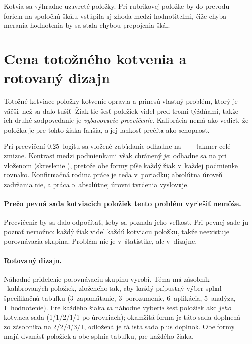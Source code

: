 Kotvia sa výhradne uzavreté položky. Pri rubrikovej položke by do prevodu foriem
na spoločnú škálu vstúpila aj zhoda medzi hodnotiteľmi, čiže chyba merania
hodnotenia by sa stala chybou prepojenia škál.

\section{Cena totožného kotvenia a rotovaný dizajn}
\label{sec:rotovane-kotvenie}

Totožné kotviace položky kotvenie opravia a prinesú vlastný problém, ktorý je
väčší, než sa dalo tušiť. Žiak tie šesť položiek videl pred tromi týždňami, takže
ich druhé zodpovedanie je \emph{vybavovacie precvičenie}. Kalibrácia nemá ako
vedieť, že položka je pre tohto žiaka ľahšia, a jej ľahkosť prečíta ako
schopnosť.

Pri precvičení 0{,}25~logitu sa vložené zabúdanie \asmEqPlanted{} odhadne na
\asmTeForgetting{}~--- takmer celé zmizne. Kontrast medzi podmienkami však
chránený \emph{je}: odhadne sa na \asmTeContrast{} pri vloženom
\asmTeContrastPlanted{} (skreslenie \asmTeContrastBias), pretože obe formy píše
každý žiak v~každej podmienke rovnako. Konfirmačná rodina práce je teda v~poriadku;
absolútna úroveň zadržania nie, a práca o~absolútnej úrovni tvrdenia vyslovuje.

\paragraph{Prečo pevná sada kotviacich položiek tento problém vyriešiť nemôže.}
Precvičenie by sa dalo odpočítať, keby sa poznala jeho veľkosť. Pri pevnej sade
ju poznať nemožno: každý žiak videl každú kotviacu položku, takže neexistuje
porovnávacia skupina. Problém nie je v~štatistike, ale v~dizajne.

\paragraph{Rotovaný dizajn.} Náhodné pridelenie porovnávaciu skupinu vyrobí. Téma
má zásobník \asmRotPool{}~kalibrovaných položiek, zloženého tak, aby každý
prípustný výber splnil špecifikačnú tabuľku (3~zapamätanie, 3~porozumenie,
6~aplikácia, 5~analýza, 1~hodnotenie). Pre každého žiaka sa náhodne vyberie šesť
položiek ako \emph{jeho} kotviaca sada (1/1/2/1/1 po úrovniach); okamžitá forma je
táto sada doplnená zo zásobníka na 2/2/4/3/1, odložená je tá istá sada plus
doplnok. Obe formy majú dvanásť položiek a obe splnia tabuľku, pre každého žiaka.

